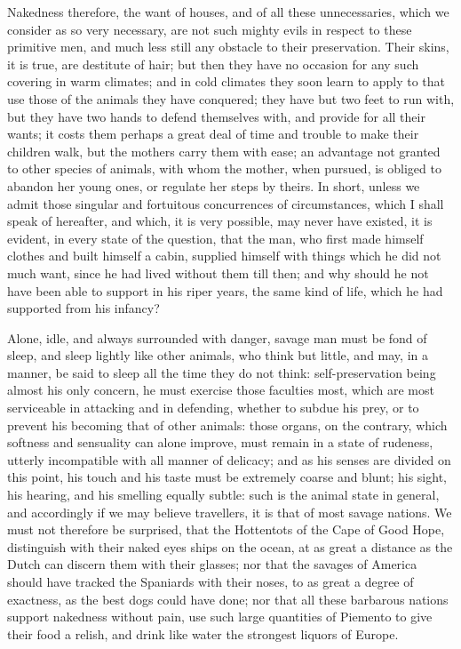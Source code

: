 \documentclass[11pt,twocolumn]{ltugboat}
\begin{document}
Nakedness therefore, the want of houses, and of all these
unnecessaries, which we consider as so very necessary, are not such
mighty evils in respect to these primitive men, and much less still
any obstacle to their preservation. Their skins, it is true, are
destitute of hair; but then they have no occasion for any such
covering in warm climates; and in cold climates they soon learn to
apply to that use those of the animals they have conquered; they have
but two feet to run with, but they have two hands to defend themselves
with, and provide for all their wants; it costs them perhaps a great
deal of time and trouble to make their children walk, but the mothers
carry them with ease; an advantage not granted to other species of
animals, with whom the mother, when pursued, is obliged to abandon her
young ones, or regulate her steps by theirs. In short, unless we admit
those singular and fortuitous concurrences of circumstances, which I
shall speak of hereafter, and which, it is very possible, may never
have existed, it is evident, in every state of the question, that the
man, who first made himself clothes and built himself a cabin,
supplied himself with things which he did not much want, since he had
lived without them till then; and why should he not have been able to
support in his riper years, the same kind of life, which he had
supported from his infancy?

Alone, idle, and always surrounded with danger, savage man must be
fond of sleep, and sleep lightly like other animals, who think but
little, and may, in a manner, be said to sleep all the time they do
not think: self-preservation being almost his only concern, he must
exercise those faculties most, which are most serviceable in attacking
and in defending, whether to subdue his prey, or to prevent his
becoming that of other animals: those organs, on the contrary, which
softness and sensuality can alone improve, must remain in a state of
rudeness, utterly incompatible with all manner of delicacy; and as his
senses are divided on this point, his touch and his taste must be
extremely coarse and blunt; his sight, his hearing, and his smelling
equally subtle: such is the animal state in general, and accordingly
if we may believe travellers, it is that of most savage nations. We
must not therefore be surprised, that the Hottentots of the Cape of
Good Hope, distinguish with their naked eyes ships on the ocean, at as
great a distance as the Dutch can discern them with their glasses; nor
that the savages of America should have tracked the Spaniards with
their noses, to as great a degree of exactness, as the best dogs could
have done; nor that all these barbarous nations support nakedness
without pain, use such large quantities of Piemento to give their food
a relish, and drink like water the strongest liquors of Europe.
\end{document}
